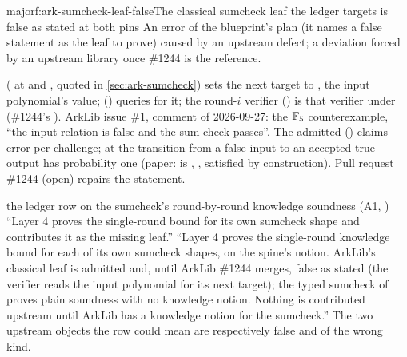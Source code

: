 \begin{finding}{major}{f:ark-sumcheck-leaf-false}{The classical sumcheck leaf the ledger targets is false as stated at both pins}
 An error of the blueprint's plan (it names a false statement as the leaf
to prove) caused by an upstream defect; a deviation forced by an upstream library once \#1244 is
the reference.

 
( at  and , quoted in
\cref{sec:ark-sumcheck}) sets the next target to , the input
polynomial's value;  () queries
 for it; the round-$i$ verifier () is that verifier under
 (\#1244's ). ArkLib issue \#1, comment of
2026-09-27: the $\mathbb{F}_5$ counterexample, ``the input relation is false and the sum check passes''.
The admitted  () claims error
 per challenge; at  the transition from a false input to an accepted
true output has probability one (paper:  is
, , satisfied by construction). Pull request
\#1244 (open) repairs the statement.

\begin{change}{the ledger row on the sumcheck's round-by-round knowledge soundness (A1, )}
\asis ``Layer 4 proves the single-round bound for its own sumcheck shape and contributes it as
the missing leaf.''
\asproposed ``Layer 4 proves the single-round knowledge bound for each of its own sumcheck
shapes, on the spine's notion. ArkLib's classical leaf
 is admitted and, until
ArkLib \#1244 merges, false as stated (the verifier reads the input polynomial for its next
target); the typed sumcheck of  proves plain soundness with no
knowledge notion. Nothing is contributed upstream until ArkLib has a knowledge notion for the
sumcheck.''
\reason The two upstream objects the row could mean are respectively false and of the wrong
kind.
\end{change}
\end{finding}

